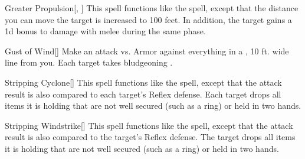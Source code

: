 \lowercase{\hypertarget{spell:Greater Propulsion}{}}\label{spell:Greater Propulsion}
\begin{apability}[\nth{2}]{\hypertarget{spell:Greater Propulsion}{Greater Propulsion}}[, ]
This spell functions like the  spell, except that the distance you can move the target is increased to 100 feet.
In addition, the target gains a \plus1d bonus to damage with melee  during the same phase.
\end{apability}
\vspace{0.25em}



\lowercase{\hypertarget{spell:Gust of Wind}{}}\label{spell:Gust of Wind}
\begin{apability}[\nth{2}]{\hypertarget{spell:Gust of Wind}{Gust of Wind}}[]
Make an attack vs. Armor against everything in a \arealarge, 10 ft. wide line from you.
\hit Each target takes bludgeoning .
\end{apability}
\vspace{0.25em}



\lowercase{\hypertarget{spell:Stripping Cyclone}{}}\label{spell:Stripping Cyclone}
\begin{apability}[\nth{2}]{\hypertarget{spell:Stripping Cyclone}{Stripping Cyclone}}[]
This spell functions like the  spell, except that the attack result is also compared to each target's Reflex defense.
\hit Each target drops all items it is holding that are not well secured (such as a ring) or held in two hands.
\end{apability}
\vspace{0.25em}



\lowercase{\hypertarget{spell:Stripping Windstrike}{}}\label{spell:Stripping Windstrike}
\begin{apability}[\nth{2}]{\hypertarget{spell:Stripping Windstrike}{Stripping Windstrike}}[]
This spell functions like the  spell, except that the attack result is also compared to the target's Reflex defense.
\hit The target drops all items it is holding that are not well secured (such as a ring) or held in two hands.
\end{apability}
\vspace{0.25em}



